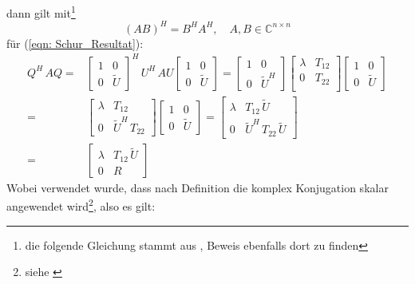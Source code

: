 \documentclass[a4paper,12pt]{report}
\newcommand{\C}{\mathbb C}
\newcommand{\klammer}[1]{\left(#1\right)}
\newcommand{\1}{\mathds{1}}
\theoremstyle{plain} %
\theoremstyle{definition} %
\theoremstyle{remark}
\begin{document}
            dann gilt mit\footnote{die folgende Gleichung stammt aus \cite{conjugateTranspose}, Beweis ebenfalls dort zu finden}
            \begin{equation}
                  \label{eqn: Produkt Adjungierter}
                  \klammer{AB}^H = B^HA^H,\quad A,B\in \C^{n\times n}
            \end{equation}
            für (\ref{eqn: Schur_Resultat}):
            $$\begin{aligned}
                  Q^H\,AQ =& \begin{bmatrix}
                        1&0\\
                        0&\widetilde U
                  \end{bmatrix}^H\,U^H\,AU \begin{bmatrix}
                        1&0\\
                        0&\widetilde U
                  \end{bmatrix} = \begin{bmatrix}
                        1&0\\
                        0&\widetilde U^H
                  \end{bmatrix}
                  \begin{bmatrix}
                        \lambda & T_{12} \\
                        0 & T_{22} \\
                  \end{bmatrix}
                  \begin{bmatrix}
                        1&0\\
                        0&\widetilde U
                  \end{bmatrix}\\
                  =& \begin{bmatrix}
                        \lambda&T_{12}\\
                        0&\widetilde U^H\, T_{22}
                  \end{bmatrix}
                  \begin{bmatrix}
                        1&0\\
                        0&\widetilde U
                  \end{bmatrix}
                  = \begin{bmatrix}
                        \lambda&T_{12}\,\widetilde U\\
                        0&\widetilde U^H\, T_{22}\, \widetilde U
                  \end{bmatrix}\\
                  =& \begin{bmatrix}
                        \lambda&T_{12}\,\widetilde U\\
                        0&R
                  \end{bmatrix}
            \end{aligned}$$
            Wobei verwendet wurde, dass nach Definition die komplex Konjugation skalar angewendet wird\footnote{siehe \cite[S. 14]{matrixGolub}}, also es gilt:
           
\end{document}
